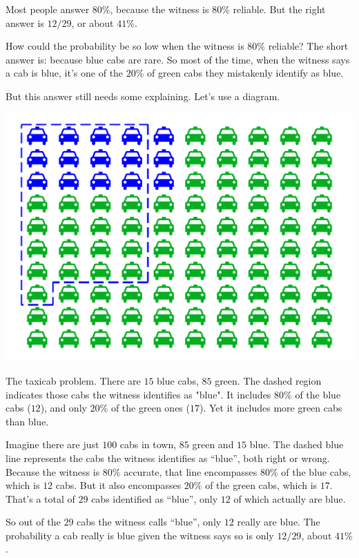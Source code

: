 \documentclass[justified]{tufte-book}
\theoremstyle{definition}
\theoremstyle{definition}
\theoremstyle{definition}
\theoremstyle{remark}
\begin{document}
Most people answer \(80\%\), because the witness is \(80\%\) reliable. But the right answer is \(12/29\), or about \(41\%\).

How could the probability be so low when the witness is \(80\%\) reliable? The short answer is: because blue cabs are rare. So most of the time, when the witness says a cab is blue, it's one of the \(20\%\) of green cabs they mistakenly identify as blue.

But this answer still needs some explaining. Let's use a diagram.

\begin{marginfigure}
\includegraphics{_main_files/figure-latex/taxigrid-11} \caption[The taxicab problem]{The taxicab problem. There are $15$ blue cabs, $85$ green. The dashed region indicates those cabs the witness identifies as "blue". It includes $80\%$ of the blue cabs ($12$), and only $20\%$ of the green ones ($17$). Yet it includes more green cabs than blue.}\label{fig:taxigrid}
\end{marginfigure}

Imagine there are just \(100\) cabs in town, \(85\) green and \(15\) blue. The dashed blue line represents the cabs the witness identifies as
``blue'', both right or wrong. Because the witness is \(80\%\) accurate, that line encompasses \(80\%\) of the blue cabs, which is \(12\) cabs. But it also encompasses \(20\%\) of the green cabs, which is \(17\). That's a total of \(29\) cabs identified as ``blue'', only \(12\) of which actually are blue.

So out of the \(29\) cabs the witness calls ``blue'', only \(12\) really are blue. The probability a cab really is blue given the witness says so is only \(12/29\), about \(41\%\).
\end{document}
